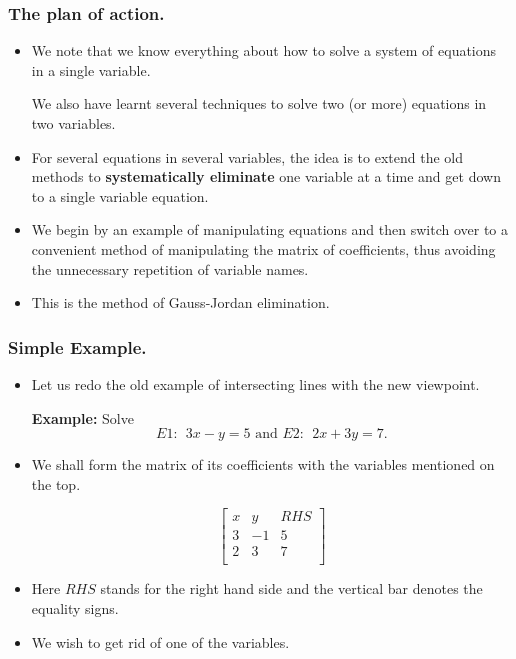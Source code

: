 \begin{frame}%
  \frametitle{The plan of action.}
  \begin{itemize}%
 
\item We note that we know everything about how to solve a system of
equations in a single variable.

We also have learnt several techniques to solve two (or more) equations
in two variables.

\item For several equations in several variables, the idea is to extend
the old methods to {\bf systematically eliminate} one variable at a time
and get down to a single variable equation.

\item We begin by an example of manipulating equations and then switch
over to a convenient method of manipulating the matrix of coefficients,
thus avoiding the unnecessary repetition of variable names.

\item This is the method of Gauss-Jordan elimination.

\end{itemize}
\end{frame}


\begin{frame}%
  \frametitle{Simple Example.}
  \begin{itemize}%
 
\item Let us redo the old example of intersecting lines with the new
viewpoint.

{\bf Example:} Solve
$$E1:~~3x-y=5 \mbox{ and } E2:~~ 2x+3y = 7.$$

\item We shall form the matrix of its coefficients with the variables
mentioned on the top.

$$\left[
\begin{array}{rr|l}
x & y & RHS \\
3 & -1 & 5 \\
2 & 3 & 7 \\
\end{array}
\right]
$$

\item Here $RHS$ stands for the right hand side and the vertical bar
denotes the equality signs.

\item We wish to get rid of one of the variables.

\end{itemize}
\end{frame}

